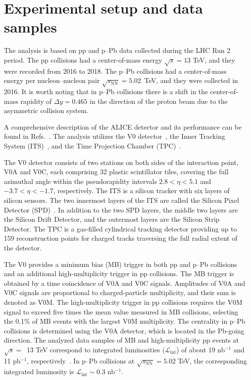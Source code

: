 

\section{Experimental setup and data samples}
\label{sec:experiment}

The analysis is based on pp and p--Pb data collected during the LHC Run 2 period. The pp collisions had a center-of-mass energy $\sqrt{s} = 13$ TeV, and they were recorded from 2016 to 2018.
The p--Pb collisions had a center-of-mass energy per nucleon--nucleon pair $\sqrt{s_\mathrm{NN}} = 5.02$~TeV, and they were collected in 2016. It is worth noting that in p--Pb collisions there is a shift in the center-of-mass rapidity of $\Delta y = 0.465$ in the direction of the proton beam due to the asymmetric collision system.

A comprehensive description of the ALICE detector and its performance can be found in Refs.~\cite{Aamodt:2008zz, Abelev:2014ffa, ALICE:2022wpn}. The analysis utilizes the V0 detector~\cite{Abbas:2013taa}, the Inner Tracking System (ITS)~\cite{aliceITS, ALICE:2013nwm}, and the Time Projection Chamber (TPC)~\cite{aliceTPC}. 

The V0 detector consists of two stations on both sides of the interaction point, V0A and V0C, each comprising 32 plastic scintillator tiles, covering the full azimuthal angle within the pseudorapidity intervals $2.8 < \eta < 5.1$ and $-3.7 < \eta < -1.7$, respectively. 
The ITS is a silicon tracker with six layers of silicon sensors. The two innermost layers of the ITS are called the Silicon Pixel Detector (SPD)~\cite{Santoro2009:ALICESPD}. In addition to the two SPD layers, the middle two layers are the Silicon Drift Detector, and the outermost layers are the Silicon Strip Detector. The TPC is a gas-filled cylindrical tracking detector providing up to 159 reconstruction points for charged tracks traversing the full radial extent of the detector.

The V0 provides a minimum bias (MB) trigger in both pp and p--Pb collisions and an additional high-multiplicity trigger in pp collisions. The MB trigger is obtained by a time coincidence of V0A and V0C signals. 
Amplitudes of V0A and V0C signals are proportional to charged-particle multiplicity, and their sum is denoted as V0M.  
The high-multiplicity trigger in pp collisions requires the V0M signal to exceed five times the mean value measured in MB collisions, selecting the 0.1\% of MB events with the largest V0M multiplicity. The centrality in p--Pb collisions is determined using the V0A detector, which is located in the Pb-going direction. The analyzed data samples of MB and high-multiplicity pp events at $\sqrt{s}=$~13 TeV correspond to integrated luminosities ($\mathcal{L}_\mathrm{int}$) of about 19 nb$^{-1}$ and 11 pb$^{-1}$, respectively~\cite{ALICE:2016nst}. In p--Pb collisions at $\sqrt{s_\mathrm{NN}} = 5.02$ TeV, the corresponding integrated luminosity is $\mathcal{L}_\mathrm{int} \sim 0.3$ nb$^{-1}$. 


